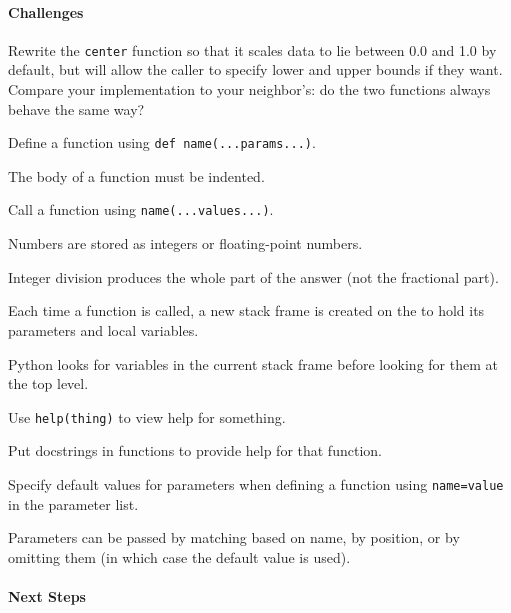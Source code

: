 \documentclass{book}
\begin{document}
\mbox{}\paragraph{Challenges}

\begin{swcenumerate}
\item
  Rewrite the \texttt{center} function so that it scales data to lie
  between 0.0 and 1.0 by default, but will allow the caller to specify
  lower and upper bounds if they want. Compare your implementation to
  your neighbor's: do the two functions always behave the same way?
\end{swcenumerate}

\begin{keypoints}
\begin{swcitemize}
\item
  Define a function using \texttt{def name(...params...)}.
\item
  The body of a function must be indented.
\item
  Call a function using \texttt{name(...values...)}.
\item
  Numbers are stored as integers or floating-point numbers.
\item
  Integer division produces the whole part of the answer (not the
  fractional part).
\item
  Each time a function is called, a new stack frame is created on the
   to hold its parameters and local
  variables.
\item
  Python looks for variables in the current stack frame before looking
  for them at the top level.
\item
  Use \texttt{help(thing)} to view help for something.
\item
  Put docstrings in functions to provide help for that function.
\item
  Specify default values for parameters when defining a function using
  \texttt{name=value} in the parameter list.
\item
  Parameters can be passed by matching based on name, by position, or by
  omitting them (in which case the default value is used).
\end{swcitemize}
\end{keypoints}

\mbox{}\paragraph{Next Steps}
\end{document}
